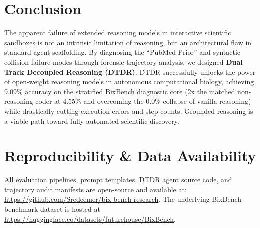 \documentclass[11pt,letterpaper]{article}
\begin{document}
\section{Conclusion}

The apparent failure of extended reasoning models in interactive scientific sandboxes is not an intrinsic limitation of reasoning, but an architectural flaw in standard agent scaffolding. By diagnosing the ``PubMed Prior'' and syntactic collision failure modes through forensic trajectory analysis, we designed \textbf{Dual Track Decoupled Reasoning (DTDR)}. DTDR successfully unlocks the power of open-weight reasoning models in autonomous computational biology, achieving 9.09\% accuracy on the stratified BixBench diagnostic core (2x the matched non-reasoning coder at 4.55\% and overcoming the 0.0\% collapse of vanilla reasoning) while drastically cutting execution errors and step counts. Grounded reasoning is a viable path toward fully automated scientific discovery.

\section*{Reproducibility \& Data Availability}
All evaluation pipelines, prompt templates, DTDR agent source code, and trajectory audit manifests are open-source and available at: \url{https://github.com/Sredeemer/bix-bench-research}. The underlying BixBench benchmark dataset is hosted at \url{https://huggingface.co/datasets/futurehouse/BixBench}.


{\footnotesize
\setlength{\itemsep}{1pt}
\setlength{\parskip}{0pt}

}
\end{document}
